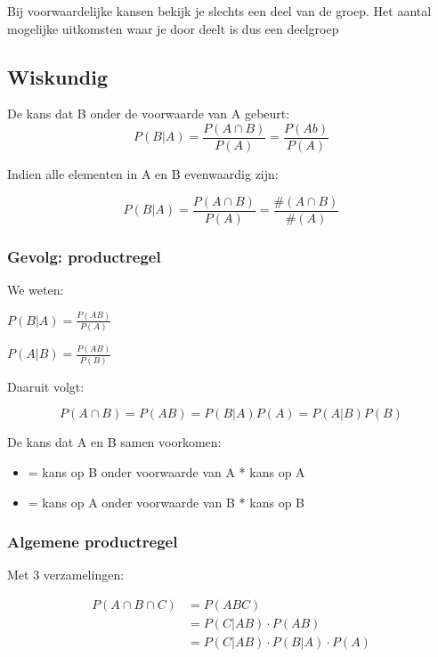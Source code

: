 \documentclass{article}
\begin{document}
Bij voorwaardelijke kansen bekijk je slechts een deel van de groep.
Het aantal mogelijke uitkomsten waar je door deelt is dus een deelgroep

\subsection{Wiskundig}

De kans dat B onder de voorwaarde van A gebeurt:
\begin{equation}
    P(B | A) = \frac{P(A \cap B)}{P(A)} = \frac{P(Ab)}{P(A)}
\end{equation}

Indien alle elementen in A en B evenwaardig zijn:

\begin{equation}
    P(B | A) = \frac{P(A \cap B)}{P(A)} = \frac{\#(A \cap B)}{\#(A)}
\end{equation}

\subsubsection{Gevolg: productregel}

We weten:

$P(B|A) = \frac{P(AB)}{P(A)}$

$P(A|B) = \frac{P(AB)}{P(B)}$

Daaruit volgt:

\begin{equation}
    P(A \cap B) = P(AB) = P (B|A) P(A) = P (A|B) P(B)
\end{equation}

De kans dat A en B samen voorkomen:

\begin{itemize}
    \item = kans op B onder voorwaarde van A * kans op A
    \item = kans op A onder voorwaarde van B * kans op B
\end{itemize}

\subsubsection{Algemene productregel}

Met 3 verzamelingen:

\begin{equation}
    \begin{split}
        P(A \cap B \cap C) & = P(ABC)\\
        & = P(C | AB) \cdot P(AB)\\
        & = P(C | AB) \cdot P (B|A) \cdot P(A) 
    \end{split}
\end{equation}
\end{document}
